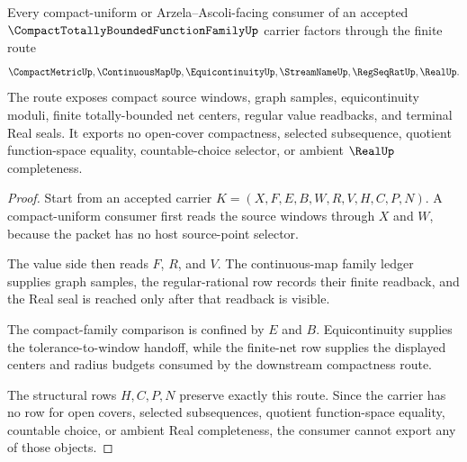\begin{theorem}
\label{thm:compact-totally-bounded-function-family-finite-net-consumer}
Every compact-uniform or Arzela--Ascoli-facing consumer of an accepted $\CompactTotallyBoundedFunctionFamilyUp$ carrier factors through the finite route
$$
\CompactMetricUp,\ContinuousMapUp,\EquicontinuityUp,\StreamNameUp,\RegSeqRatUp,\RealUp .
$$
The route exposes compact source windows, graph samples, equicontinuity moduli, finite totally-bounded net centers, regular value readbacks, and terminal Real seals. It exports no open-cover compactness, selected subsequence, quotient function-space equality, countable-choice selector, or ambient $\RealUp$ completeness.
\end{theorem}
\begin{proof}
Start from an accepted carrier $K=(X,F,E,B,W,R,V,H,C,P,N)$. A compact-uniform consumer first reads the source windows through $X$ and $W$, because the packet has no host source-point selector.

The value side then reads $F$, $R$, and $V$. The continuous-map family ledger supplies graph samples, the regular-rational row records their finite readback, and the Real seal is reached only after that readback is visible.

The compact-family comparison is confined by $E$ and $B$. Equicontinuity supplies the tolerance-to-window handoff, while the finite-net row supplies the displayed centers and radius budgets consumed by the downstream compactness route.

The structural rows $H,C,P,N$ preserve exactly this route. Since the carrier has no row for open covers, selected subsequences, quotient function-space equality, countable choice, or ambient Real completeness, the consumer cannot export any of those objects.
\end{proof}


